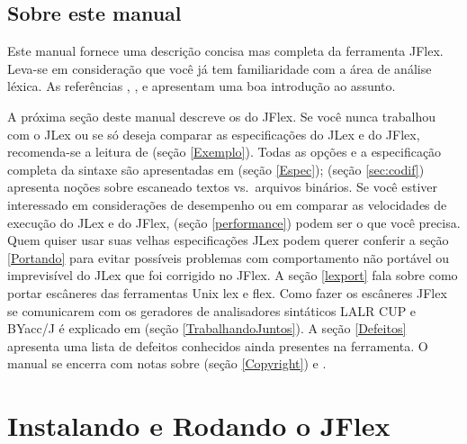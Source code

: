 \documentclass[11pt]{scrartcl}
\begin{document}
\subsection{Sobre este manual}
Este manual fornece uma descri\c{c}\~ao concisa mas completa da ferramenta JFlex. Leva-se em
considera\c{c}\~ao que voc\^e j\'a tem familiaridade com a \'area de an\'alise l\'exica. As refer\^encias \cite{Aho},
\cite{Appel}, e \cite{Maurer} apresentam uma boa introdu\c{c}\~ao ao assunto.

A pr\'oxima se\c{c}\~ao deste manual descreve os  
do JFlex. Se voc\^e nunca trabalhou com o JLex ou
se s\'o deseja comparar as especifica\c{c}\~oes do JLex e do JFlex, recomenda-se a leitura de 
(se\c{c}\~ao \ref{Exemplo}).  Todas as op\c{c}\~oes e a especifica\c{c}\~ao completa da sintaxe s\~ao
apresentadas em 
 (se\c{c}\~ao \ref{Espec});
 (se\c{c}\~ao \ref{sec:codif})
apresenta no\c{c}\~oes sobre escaneado textos vs.~arquivos bin\'arios.
Se voc\^e estiver interessado em considera\c{c}\~oes de desempenho ou em comparar as velocidades de execu\c{c}\~ao
do JLex e do JFlex, 
 (se\c{c}\~ao \ref{performance})
podem ser o que voc\^e precisa. Quem quiser usar suas velhas especifica\c{c}\~oes JLex
podem querer conferir a se\c{c}\~ao \ref{Portando}
 para evitar poss\'iveis problemas
com comportamento n\~ao port\'avel ou imprevis\'ivel do JLex que foi corrigido no JFlex.
A se\c{c}\~ao \ref{lexport} fala sobre como portar esc\^aneres das ferramentas Unix lex e flex.
Como fazer os esc\^aneres JFlex se comunicarem com os geradores de analisadores sint\'aticos LALR
CUP e BYacc/J \'e explicado em  (se\c{c}\~ao \ref{TrabalhandoJuntos}).
A se\c{c}\~ao \ref{Defeitos}
 apresenta uma lista de defeitos conhecidos ainda presentes na ferramenta.
O manual se encerra com notas sobre 
 (se\c{c}\~ao \ref{Copyright}) e
.


\section{Instalando e Rodando o JFlex\label{Instalando}}
\end{document}
